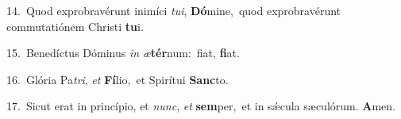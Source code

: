 {\numbfont\textcolor{\numbcolor}{14.}}~Quod exprobravérunt inimíci \textit{tu}\-\textit{i}, \textbf{Dó}\-mine,~\star quod exprobravérunt commutatiónem Christi \textbf{tu}\-i.\par
{\numbfont\textcolor{\numbcolor}{15.}}~Benedíctus Dóminus \textit{in} \textit{æ}\-\textbf{tér}num:~\star fiat, \textbf{fi}\-at.\par
{\numbfont\textcolor{\numbcolor}{16.}}~Glória Pa\-\textit{tri}\-, \textit{et} \textbf{Fí}\-lio,~\star et Spirítui \textbf{Sanc}\-to.\par
{\numbfont\textcolor{\numbcolor}{17.}}~Sicut erat in princípio, et \textit{nunc}\-, \textit{et} \textbf{sem}\-per,~\star et in sǽcula sæculórum. \textbf{A}\-men.\par
